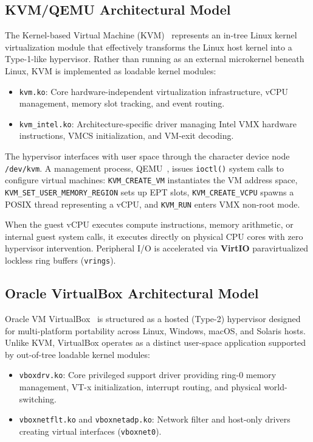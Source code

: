 \subsection{KVM/QEMU Architectural Model}
\label{subsec:kvm_arch}

The Kernel-based Virtual Machine (KVM)~\cite{kivity2007kvm} represents an in-tree Linux kernel virtualization module that effectively transforms the Linux host kernel into a Type-1-like hypervisor. Rather than running as an external microkernel beneath Linux, KVM is implemented as loadable kernel modules:
\begin{itemize}
    \item \texttt{kvm.ko}: Core hardware-independent virtualization infrastructure, vCPU management, memory slot tracking, and event routing.
    \item \texttt{kvm\_intel.ko}: Architecture-specific driver managing Intel VMX hardware instructions, VMCS initialization, and VM-exit decoding.
\end{itemize}

The hypervisor interfaces with user space through the character device node \texttt{/dev/kvm}. A management process, QEMU~\cite{bellard2005qemu}, issues \texttt{ioctl()} system calls to configure virtual machines: \texttt{KVM\_CREATE\_VM} instantiates the VM address space, \texttt{KVM\_SET\_USER\_MEMORY\_REGION} sets up EPT slots, \texttt{KVM\_CREATE\_VCPU} spawns a POSIX thread representing a vCPU, and \texttt{KVM\_RUN} enters VMX non-root mode.

When the guest vCPU executes compute instructions, memory arithmetic, or internal guest system calls, it executes directly on physical CPU cores with zero hypervisor intervention. Peripheral I/O is accelerated via \textbf{VirtIO} paravirtualized lockless ring buffers (\texttt{vrings}).

\subsection{Oracle VirtualBox Architectural Model}
\label{subsec:virtualbox_arch}

Oracle VM VirtualBox~\cite{oracle2023vbox} is structured as a hosted (Type-2) hypervisor designed for multi-platform portability across Linux, Windows, macOS, and Solaris hosts. Unlike KVM, VirtualBox operates as a distinct user-space application supported by out-of-tree loadable kernel modules:
\begin{itemize}
    \item \texttt{vboxdrv.ko}: Core privileged support driver providing ring-0 memory management, VT-x initialization, interrupt routing, and physical world-switching.
    \item \texttt{vboxnetflt.ko} and \allowbreak\texttt{vboxnetadp.ko}: Network filter and host-only drivers creating virtual interfaces (\texttt{vboxnet0}).
\end{itemize}

